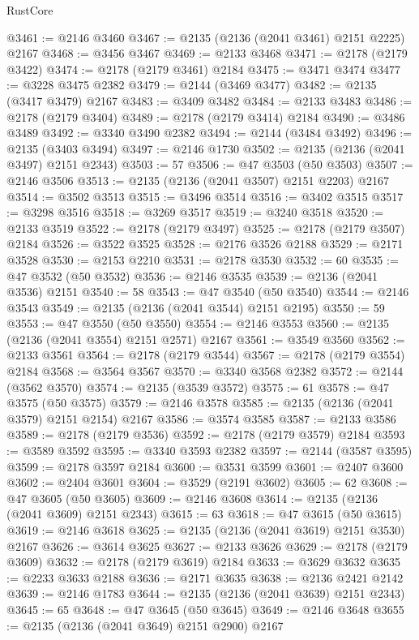 \begin{lexlean}{RustCore}
\begin{coremodule}
@3461 := @2146 @3460
@3467 := @2135 (@2136 (@2041 @3461) @2151 @2225) @2167
@3468 := @3456 @3467
@3469 := @2133 @3468
@3471 := @2178 (@2179 @3422)
@3474 := @2178 (@2179 @3461) @2184
@3475 := @3471 @3474
@3477 := @3228 @3475 @2382
@3479 := @2144 (@3469 @3477)
@3482 := @2135 (@3417 @3479) @2167
@3483 := @3409 @3482
@3484 := @2133 @3483
@3486 := @2178 (@2179 @3404)
@3489 := @2178 (@2179 @3414) @2184
@3490 := @3486 @3489
@3492 := @3340 @3490 @2382
@3494 := @2144 (@3484 @3492)
@3496 := @2135 (@3403 @3494)
@3497 := @2146 @1730
@3502 := @2135 (@2136 (@2041 @3497) @2151 @2343)
@3503 := 57
@3506 := @47 @3503 (@50 @3503)
@3507 := @2146 @3506
@3513 := @2135 (@2136 (@2041 @3507) @2151 @2203) @2167
@3514 := @3502 @3513
@3515 := @3496 @3514
@3516 := @3402 @3515
@3517 := @3298 @3516
@3518 := @3269 @3517
@3519 := @3240 @3518
@3520 := @2133 @3519
@3522 := @2178 (@2179 @3497)
@3525 := @2178 (@2179 @3507) @2184
@3526 := @3522 @3525
@3528 := @2176 @3526 @2188
@3529 := @2171 @3528
@3530 := @2153 @2210
@3531 := @2178 @3530
@3532 := 60
@3535 := @47 @3532 (@50 @3532)
@3536 := @2146 @3535
@3539 := @2136 (@2041 @3536) @2151
@3540 := 58
@3543 := @47 @3540 (@50 @3540)
@3544 := @2146 @3543
@3549 := @2135 (@2136 (@2041 @3544) @2151 @2195)
@3550 := 59
@3553 := @47 @3550 (@50 @3550)
@3554 := @2146 @3553
@3560 := @2135 (@2136 (@2041 @3554) @2151 @2571) @2167
@3561 := @3549 @3560
@3562 := @2133 @3561
@3564 := @2178 (@2179 @3544)
@3567 := @2178 (@2179 @3554) @2184
@3568 := @3564 @3567
@3570 := @3340 @3568 @2382
@3572 := @2144 (@3562 @3570)
@3574 := @2135 (@3539 @3572)
@3575 := 61
@3578 := @47 @3575 (@50 @3575)
@3579 := @2146 @3578
@3585 := @2135 (@2136 (@2041 @3579) @2151 @2154) @2167
@3586 := @3574 @3585
@3587 := @2133 @3586
@3589 := @2178 (@2179 @3536)
@3592 := @2178 (@2179 @3579) @2184
@3593 := @3589 @3592
@3595 := @3340 @3593 @2382
@3597 := @2144 (@3587 @3595)
@3599 := @2178 @3597 @2184
@3600 := @3531 @3599
@3601 := @2407 @3600
@3602 := @2404 @3601
@3604 := @3529 (@2191 @3602)
@3605 := 62
@3608 := @47 @3605 (@50 @3605)
@3609 := @2146 @3608
@3614 := @2135 (@2136 (@2041 @3609) @2151 @2343)
@3615 := 63
@3618 := @47 @3615 (@50 @3615)
@3619 := @2146 @3618
@3625 := @2135 (@2136 (@2041 @3619) @2151 @3530) @2167
@3626 := @3614 @3625
@3627 := @2133 @3626
@3629 := @2178 (@2179 @3609)
@3632 := @2178 (@2179 @3619) @2184
@3633 := @3629 @3632
@3635 := @2233 @3633 @2188
@3636 := @2171 @3635
@3638 := @2136 @2421 @2142
@3639 := @2146 @1783
@3644 := @2135 (@2136 (@2041 @3639) @2151 @2343)
@3645 := 65
@3648 := @47 @3645 (@50 @3645)
@3649 := @2146 @3648
@3655 := @2135 (@2136 (@2041 @3649) @2151 @2900) @2167

\end{coremodule}
\end{lexlean}
